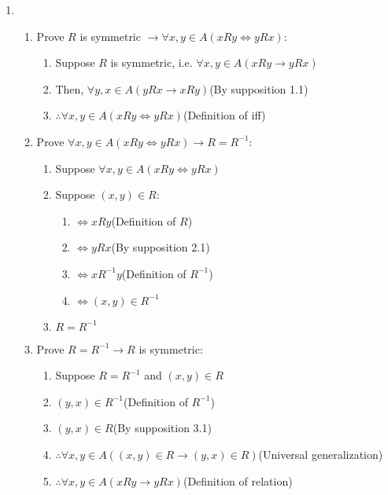 \documentclass[12pt, a4paper]{article}
\begin{document}
\begin{enumerate}[Q\arabic*.]
  \item 
    \begin{enumerate}[label=\arabic*., parsep=1em]
      \item Prove $R$ is symmetric $\rightarrow \forall x, y \in A(x R y \iff y R x)$:
        \begin{enumerate}[label=1.\arabic*., parsep=1em]
          \item Suppose $R$ is symmetric, i.e. $\forall x,y\in A(xRy \rightarrow yRx)$
          \item Then, $\forall y,x\in A(yRx\rightarrow xRy)$\hfill(By supposition 1.1)
          \item $\therefore \forall x,y\in A(xRy \iff yRx)$\hfill(Definition of iff)
        \end{enumerate}
      \item Prove $\forall x, y \in A(x R y \iff y R x) \rightarrow R = R^{-1}$:
        \begin{enumerate}[label=2.\arabic*., parsep=1em]
          \item Suppose $\forall x, y \in A(x R y \iff y R x)$
          \item Suppose $(x, y) \in R$:
          \begin{enumerate}[label=2.2.\arabic*., parsep=1em]
            \item $\iff xRy$\hfill(Definition of $R$)
            \item $\iff yRx$\hfill(By supposition 2.1)
            \item $\iff xR^{-1}y$\hfill(Definition of $R^{-1}$)
            \item $\iff (x, y) \in R^{-1}$
          \end{enumerate}
          \item $R = R^{-1}$
        \end{enumerate}
      \item Prove $R = R^{-1} \rightarrow R$ is symmetric:
        \begin{enumerate}[label=3.\arabic*., parsep=1em]
          \item Suppose $R = R^{-1}$ and $(x, y) \in R$
          \item $(y, x) \in R^{-1}$\hfill(Definition of $R^{-1}$)
          \item $(y, x)\in R$\hfill(By supposition 3.1)
          \item $\therefore \forall x, y \in A((x, y) \in R \rightarrow (y, x) \in R)$\hfill(Universal generalization)
          \item $\therefore \forall x,y\in A(xRy \rightarrow yRx)$\hfill(Definition of relation)

\end{enumerate}
\end{enumerate}
\end{enumerate}
\end{document}
